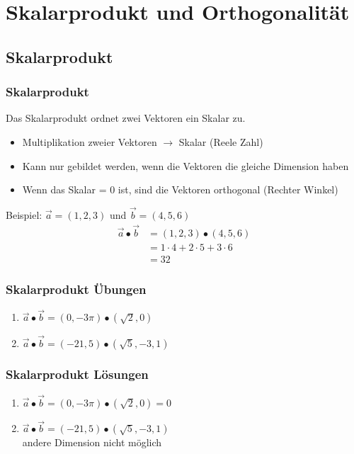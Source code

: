 \section{Skalarprodukt und Orthogonalität}
\subsection{Skalarprodukt}
\begin{frame}
    \frametitle{Skalarprodukt}
    Das Skalarprodukt ordnet zwei Vektoren ein Skalar zu.
    \begin{itemize}
	    \item Multiplikation zweier Vektoren $\rightarrow$ Skalar (Reele Zahl)
	    \item Kann nur gebildet werden, wenn die Vektoren die gleiche Dimension haben
	    \item Wenn das Skalar = 0 ist, sind die Vektoren orthogonal (Rechter Winkel)
    \end{itemize}
	Beispiel: $\vec{a} = (1,2,3)$ und $\vec{b} = (4,5,6)$
	\begin{align*}
		\vec{a} \bullet \vec{b} &= (1,2,3) \bullet (4,5,6) \\
		&= 1 \cdot 4 + 2 \cdot 5 + 3 \cdot 6 \\
		&= 32
	\end{align*}
\end{frame}


\begin{frame}
    \frametitle{Skalarprodukt Übungen}
	\begin{enumerate}
		\item $\vec{a} \bullet \vec{b} = (0, -3\pi) \bullet (\sqrt{2}, 0)$ 
		\item $\vec{a} \bullet \vec{b} = (-21, 5) \bullet (\sqrt{5}, -3, 1)$
	\end{enumerate}
\end{frame}

\begin{frame}
    \frametitle{Skalarprodukt Lösungen}
	\begin{enumerate}
		\item $\vec{a} \bullet \vec{b} = (0, -3\pi) \bullet (\sqrt{2}, 0) = 0$ 
		\item $\vec{a} \bullet \vec{b} = (-21, 5) \bullet (\sqrt{5}, -3, 1)$ \\andere Dimension nicht möglich
	\end{enumerate}
\end{frame}

